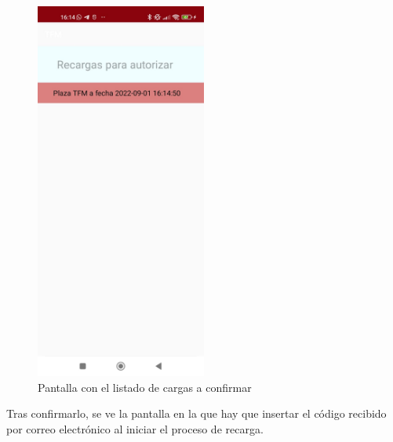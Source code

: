 \documentclass[12pt,a4paper,onecolumn,oneside]{report}
\begin{document}
\begin{figure}[H] 
\centering
  \includegraphics[width=0.5\textwidth]{figuras/design7.png}
  \caption[Pantalla con el listado de cargas a confirmar]{Pantalla con el listado de cargas a confirmar\\
  }
  \label{fig:design7}
\end{figure}

Tras confirmarlo, se ve la pantalla en la que hay que insertar el código recibido por correo electrónico al iniciar el proceso de recarga.
\end{document}

